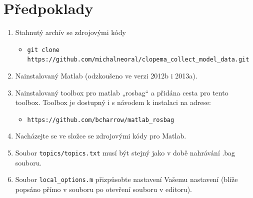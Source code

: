 \documentclass[10pt,a4paper,titlepage,oneside]{report}
\begin{document}
\section{Předpoklady}
\begin{enumerate}
  \item Stahnutý archív se zdrojovými kódy
  \begin{itemize}
  	\item \verb|git clone https://github.com/michalneoral/clopema_collect_model_data.git|
  \end{itemize}
  
  \item Nainstalovaný Matlab (odzkoušeno ve verzi 2012b i 2013a).
  \item Nainstalovaný toolbox pro matlab „rosbag“ a přidána cesta pro tento toolbox. Toolbox je dostupný i s návodem k instalaci na adrese:
  \begin{itemize}
     \item \verb|https://github.com/bcharrow/matlab_rosbag|
  \end{itemize}
  \item Nacházejte se ve složce se zdrojovými kódy pro Matlab.
  \item Soubor \verb|topics/topics.txt| musí být stejný jako v době nahrávání .bag souboru.
  \item Soubor \verb|local_options.m| přizpůsobte nastavení Vašemu nastavení (blíže popsáno přímo v souboru po otevření souboru v editoru).
\end{enumerate}
\end{document}
